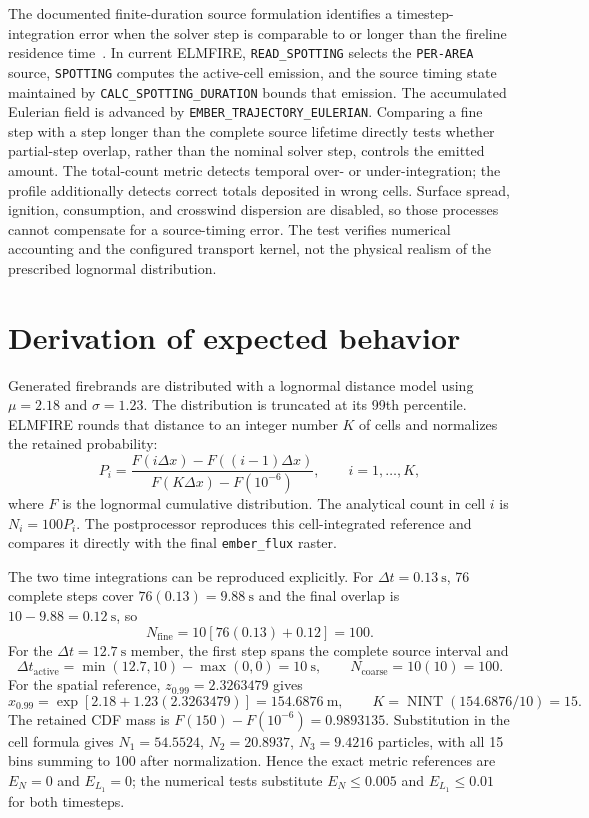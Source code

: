 The documented finite-duration source formulation identifies a timestep-integration
error when the solver step is comparable to or longer than the fireline residence
time~\cite{Qin2025}. In current ELMFIRE,
\texttt{READ\_SPOTTING} selects the \texttt{PER-AREA} source,
\texttt{SPOTTING} computes the active-cell emission, and the source timing
state maintained by \texttt{CALC\_SPOTTING\_DURATION} bounds that emission.
The accumulated Eulerian field is advanced by
\texttt{EMBER\_TRAJECTORY\_EULERIAN}. Comparing a fine step with a step
longer than the complete source lifetime directly tests whether partial-step
overlap, rather than the nominal solver step, controls the emitted amount.
The total-count metric detects temporal over- or under-integration; the profile
 additionally detects correct totals deposited in wrong cells.
Surface spread, ignition, consumption, and crosswind dispersion are disabled,
so those processes cannot compensate for a source-timing error. The test
verifies numerical accounting and the configured transport kernel, not the
physical realism of the prescribed lognormal distribution.

\section{Derivation of expected behavior}
Generated firebrands are distributed with a lognormal distance model using
$\mu=2.18$ and $\sigma=1.23$. The distribution is truncated at its 99th
percentile. ELMFIRE rounds that distance to an integer number $K$ of cells and
normalizes the retained probability:
\[
  P_i=\frac{F(i\Delta x)-F((i-1)\Delta x)}
             {F(K\Delta x)-F(10^{-6})},\qquad i=1,\ldots,K,
\]
where $F$ is the lognormal cumulative distribution. The analytical count in
cell $i$ is $N_i=100P_i$. The postprocessor reproduces this cell-integrated
reference and compares it directly with the final \texttt{ember\_flux} raster.

The two time integrations can be reproduced explicitly.  For
\(\Delta t=0.13~\mathrm{s}\), 76 complete steps cover
\(76(0.13)=9.88~\mathrm{s}\) and the final overlap is
\(10-9.88=0.12~\mathrm{s}\), so
\[
 N_{\mathrm{fine}}=10[76(0.13)+0.12]=100.
\]
For the \(\Delta t=12.7~\mathrm{s}\) member, the first step spans the complete
source interval and
\[
 \Delta t_{\mathrm{active}}=\min(12.7,10)-\max(0,0)=10~\mathrm{s},
 \qquad N_{\mathrm{coarse}}=10(10)=100.
\]
For the spatial reference, \(z_{0.99}=2.3263479\) gives
\[
 x_{0.99}=\exp[2.18+1.23(2.3263479)]=154.6876~\mathrm{m},
 \qquad K=\operatorname{NINT}(154.6876/10)=15.
\]
The retained CDF mass is
\(F(150)-F(10^{-6})=0.9893135\).  Substitution in the cell formula gives
\(N_1=54.5524\), \(N_2=20.8937\), \(N_3=9.4216\) particles, with all 15
bins summing to 100 after normalization.  Hence the exact metric references
are \(E_N=0\) and \(E_{L_1}=0\); the numerical tests substitute
\(E_N\leq0.005\) and \(E_{L_1}\leq0.01\) for both timesteps.

